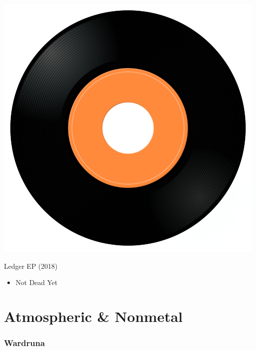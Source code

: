 \begin{minipage}[t]{0.25\textwidth}\vspace{0pt}
\captionsetup{type=figure}
\includegraphics[width=\textwidth]{Images/cover.png}
\caption*{Ledger EP (2018)}
\end{minipage}
\begin{minipage}[t]{0.25\textwidth}\vspace{0pt}
\begin{itemize}[nosep,leftmargin=1em,labelwidth=*,align=left]
	\setlength{\itemsep}{0pt}
	\item Not Dead Yet
\end{itemize}
\end{minipage}


\section{Atmospheric \& Nonmetal}

\subsubsection{Wardruna}


